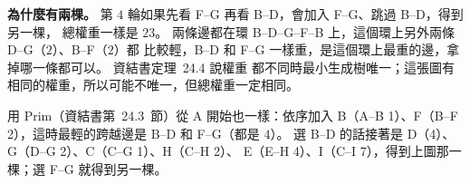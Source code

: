 \begin{pastsoln}
\textbf{為什麼有兩棵。} 第 $4$ 輪如果先看 F--G 再看 B--D，會加入 F--G、跳過 B--D，得到另一棵，
總權重一樣是 $23$。 兩條邊都在環 B--D--G--F--B 上，這個環上另外兩條 D--G（$2$）、B--F（$2$）都
比較輕，B--D 和 F--G 一樣重，是這個環上最重的邊，拿掉哪一條都可以。 資結書定理~24.4 說權重
都不同時最小生成樹唯一；這張圖有相同的權重，所以可能不唯一，但總權重一定相同。

用 Prim（資結書第~24.3~節）從 A 開始也一樣：依序加入 B（A--B 1）、F（B--F 2），這時最輕的跨越邊是
B--D 和 F--G（都是 $4$）。 選 B--D 的話接著是 D（4）、G（D--G 2）、C（C--G 1）、H（C--H 2）、
E（E--H 4）、I（C--I 7），得到上圖那一棵；選 F--G 就得到另一棵。
\end{pastsoln}
